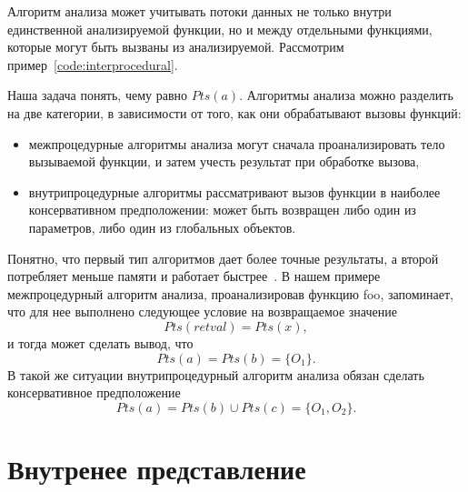 \documentclass[14pt,titlepage,draft]{extarticle}
\newcommand{\NEW}{\textbf{new}}
\newcommand{\eng}[1]{{\English#1}}
\let\oldsection\section
\renewcommand{\section}{\newpage\oldsection}
\begin{document}
        Алгоритм анализа может учитывать потоки данных не только внутри
        единственной анализируемой функции, но и между отдельными функциями,
        которые могут быть вызваны из анализируемой.
        Рассмотрим пример~\ref{code:interprocedural}.

        \label{code:interprocedural}

        Наша задача понять, чему равно $Pts(a)$.
        Алгоритмы анализа можно разделить на две категории, в зависимости от
        того, как они обрабатывают вызовы функций:
        \begin{itemize}
          \item межпроцедурные алгоритмы анализа могут сначала проанализировать
                тело вызываемой функции, и затем учесть результат при обработке
                вызова,
          \item внутрипроцедурные алгоритмы рассматривают вызов функции в
                наиболее консервативном предположении: может быть возвращен
                либо один из параметров, либо один из глобальных объектов.
        \end{itemize}
        Понятно, что первый тип алгоритмов дает более точные результаты,
        а второй потребляет меньше памяти и работает
        быстрее~\cite[с.~117]{andersen}.
        В нашем примере межпроцедурный алгоритм анализа, проанализировав
        функцию \eng{foo}, запоминает, что для нее выполнено следующее условие
        на возвращаемое значение
        \[Pts(retval) = Pts(x),\]
        и тогда может сделать вывод, что \[Pts(a) = Pts(b) = \{O_1\}.\]
        В такой же ситуации внутрипроцедурный алгоритм анализа обязан сделать
        консервативное предположение
        \[Pts(a) = Pts(b) \cup Pts(c) = \{O_1, O_2\}.\]

  \section{Внутренее представление}
\end{document}
